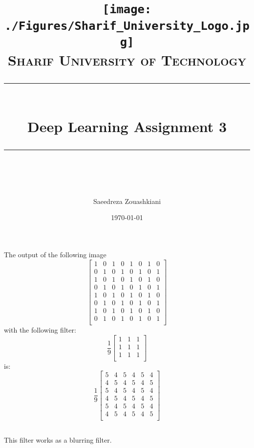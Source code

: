 \documentclass[11pt]{scrartcl} %
\title{	
	\texttt{[image: ./Figures/Sharif\_University\_Logo.jpg]}\\
	\normalfont\normalsize
	\textsc{Sharif University of Technology}\\ %
	\vspace{25pt} %
	\rule{\linewidth}{0.5pt}\\ %
	\vspace{20pt} %
	{\huge Deep Learning Assignment 3}\\ %
	\vspace{12pt} %
	\rule{\linewidth}{2pt}\\ %
	\vspace{12pt} %
}
\author{\LARGE Saeedreza Zouashkiani} %
\date{\normalsize\today} %
\begin{document}
\maketitle %

\section{} %
\subsection{} %
The output of the following image
\begin{equation}
\begin{bmatrix}
1 & 0 & 1 & 0 & 1 & 0 & 1 & 0\\
0 & 1 & 0 & 1 & 0 & 1 & 0 & 1\\
1 & 0 & 1 & 0 & 1 & 0 & 1 & 0\\
0 & 1 & 0 & 1 & 0 & 1 & 0 & 1\\
1 & 0 & 1 & 0 & 1 & 0 & 1 & 0\\
0 & 1 & 0 & 1 & 0 & 1 & 0 & 1\\
1 & 0 & 1 & 0 & 1 & 0 & 1 & 0\\
0 & 1 & 0 & 1 & 0 & 1 & 0 & 1\\
\end{bmatrix}
\end{equation}
with the following filter:
\begin{equation}
\frac{1}{9}
\begin{bmatrix}
1 & 1 & 1\\
1 & 1 & 1\\
1 & 1 & 1\\
\end{bmatrix}
\end{equation}
is:
\begin{equation}
\frac{1}{9}
\begin{bmatrix}
5 & 4 & 5 & 4 & 5 & 4 \\
4 & 5 & 4 & 5 & 4 & 5 \\
5 & 4 & 5 & 4 & 5 & 4 \\
4 & 5 & 4 & 5 & 4 & 5 \\
5 & 4 & 5 & 4 & 5 & 4 \\
4 & 5 & 4 & 5 & 4 & 5 \\
\end{bmatrix}
\end{equation}
\subsection{} %
This filter works as a blurring filter.
\end{document}
